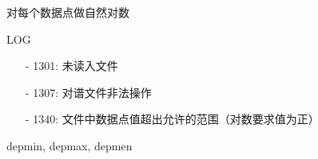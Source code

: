 \label{cmd:log}

对每个数据点做自然对数

\begin{SACSTX}
LOG
\end{SACSTX}

\begin{itemize}
\item[-]1301: 未读入文件
\item[-]1307: 对谱文件非法操作
\item[-]1340: 文件中数据点值超出允许的范围（对数要求值为正）
\end{itemize}

depmin, depmax, depmen
